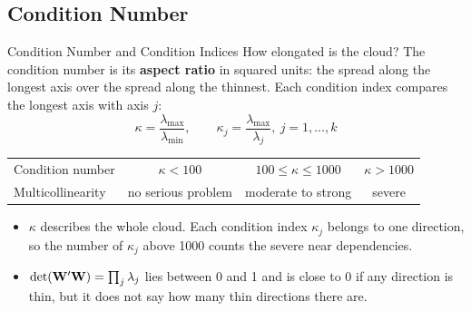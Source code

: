\subsection{Condition Number}


\begin{frame}{Condition Number and Condition Indices}
    \small
    How elongated is the cloud? The condition number is its \textbf{aspect ratio} in squared units: the spread along the longest axis over the spread along the thinnest. Each condition index compares the longest axis with axis $j$:
    \[
    \kappa=\frac{\lambda_{\max}}{\lambda_{\min}},
    \qquad
    \kappa_j=\frac{\lambda_{\max}}{\lambda_j},\ j=1,\dots,k
    \]
    \begin{center}
        \small
        \begin{tabular}{lccc}
            \toprule
            Condition number & $\kappa<100$ & $100\le\kappa\le1000$ & $\kappa>1000$ \\
            Multicollinearity & no serious problem & moderate to strong & severe \\
            \bottomrule
        \end{tabular}
    \end{center}
    \begin{itemize}
        \item $\kappa$ describes the whole cloud. Each condition index $\kappa_j$ belongs to one direction, so the number of $\kappa_j$ above 1000 counts the severe near dependencies.
        \item $\det(\mathbf{W}'\mathbf{W})=\prod_j\lambda_j$ lies between 0 and 1 and is close to 0 if any direction is thin, but it does not say how many thin directions there are.
    \end{itemize}
\end{frame}


